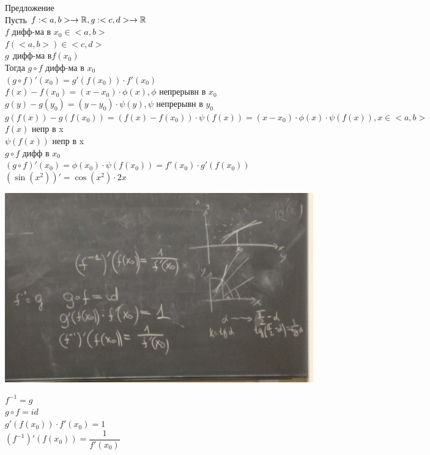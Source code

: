 Предложение \\
Пусть $ f : <a,b> \rightarrow \mathbb{R}, g : <c, d> \rightarrow \mathbb{R} $ \\
$ f $ дифф-ма в $ x_0 \in <a,b> $ \\
$ f(<a,b>) \in <c,d> $ \\
$ g \ \ \text{дифф-ма в} f(x_0) $ \\
Тогда $ g \circ f $ дифф-ма в $ x_0 $ \\
$ (g \circ f)' (x_0) = g'(f(x_0)) \cdot f'(x_0) $ \\
$ f(x) - f(x_0) =(x-x_0) \cdot \phi(x), \phi $ непрерывн в $x_0$ \\
$ g(y) - g(y_0) = (y - y_0) \cdot \psi (y), \psi $ непрерывн в $ y_0 $ \\
$ g(f(x)) - g(f(x_0)) = ( f(x) - f(x_0) ) \cdot \psi(f(x)) = (x-x_0) \cdot \phi(x) \cdot \psi(f(x)), x \in <a,b> $ \\
$ f(x) $ непр в x \\
$ \psi(f(x)) $ непр в x \\
$ g \circ f $ дифф в $ x_0$ \\
$ (g \circ f)'(x_0) = \phi(x_0) \cdot \psi(f(x_0)) = f'(x_0) \cdot g'(f(x_0)) $ \\

$ (\sin(x^2))' = \cos(x^2) \cdot 2x $

\begin{center}
	\includegraphics[width=0.9\linewidth]{IMG_20181119_133702}
\end{center}

$ f^{-1} = g $ \\
$ g \circ f = id $ \\
$ g'(f(x_0)) \cdot f'(x_0) = 1 $ \\
$ (f^{-1})' (f(x_0)) = \dfrac{1}{f'(x_0)} $\\

 






 